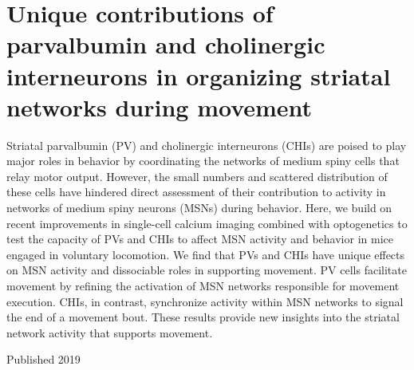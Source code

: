 \section*{Unique contributions of parvalbumin and cholinergic interneurons in organizing striatal networks during movement}

Striatal parvalbumin (PV) and cholinergic interneurons (CHIs) are poised to play major roles in behavior by coordinating the networks of medium spiny cells that relay motor output.
However, the small numbers and scattered distribution of these cells have hindered direct assessment of their contribution to activity in networks of medium spiny neurons (MSNs) during behavior.
Here, we build on recent improvements in single-cell calcium imaging combined with optogenetics to test the capacity of PVs and CHIs to affect MSN activity and behavior in mice engaged in voluntary locomotion.
We find that PVs and CHIs have unique effects on MSN activity and dissociable roles in supporting movement.
PV cells facilitate movement by refining the activation of MSN networks responsible for movement execution.
CHIs, in contrast, synchronize activity within MSN networks to signal the end of a movement bout.
These results provide new insights into the striatal network activity that supports movement.

Published 2019 \cite{Gritton_2019}

